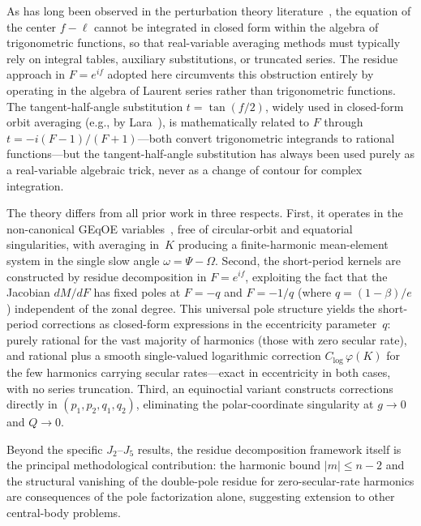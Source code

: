 As has long been observed in the perturbation theory
literature~\cite{jefferys1971}, the equation of the center $f - \ell$
cannot be integrated in closed form within the algebra of trigonometric
functions, so that real-variable averaging methods must typically rely on
integral tables, auxiliary substitutions, or truncated series.  The residue approach in $F = e^{if}$
adopted here circumvents this obstruction entirely by operating in the
algebra of Laurent series rather than trigonometric functions.  The
tangent-half-angle substitution $t = \tan(f/2)$, widely used in
closed-form orbit averaging (e.g., by Lara~\cite{lara2020}), is
mathematically related to $F$ through $t = -i(F-1)/(F+1)$---both convert
trigonometric integrands to rational functions---but the tangent-half-angle
substitution has always been used purely as a real-variable algebraic
trick, never as a change of contour for complex integration.

The theory differs from all prior work in three respects.
First, it operates in the non-canonical GEqOE variables~\cite{bau2021},
free of circular-orbit and equatorial singularities, with averaging in~$K$
producing a finite-harmonic mean-element system in the single slow angle
$\omega = \Psi - \Omega$.
Second, the short-period kernels are constructed by residue decomposition
in $F = e^{if}$, exploiting the fact that the Jacobian $dM/dF$ has fixed
poles at $F = -q$ and $F = -1/q$ (where $q = (1-\beta)/e$) independent of
the zonal degree.  This universal pole structure yields the short-period
corrections as closed-form expressions in the eccentricity parameter~$q$:
purely rational for the vast majority of harmonics (those with zero
secular rate), and rational plus a smooth single-valued logarithmic
correction $C_{\log}\,\varphi(K)$ for the few harmonics carrying
secular rates---exact in eccentricity in both cases, with no series
truncation.
Third, an equinoctial variant constructs corrections directly in
$(p_1,p_2,q_1,q_2)$, eliminating the polar-coordinate singularity at
$g \to 0$ and $Q \to 0$.

Beyond the specific $J_2$--$J_5$ results, the residue decomposition
framework itself is the principal methodological contribution: the
harmonic bound $|m| \leq n-2$ and the structural vanishing of the
double-pole residue for zero-secular-rate harmonics are consequences of
the pole factorization alone, suggesting extension to other central-body
problems.

